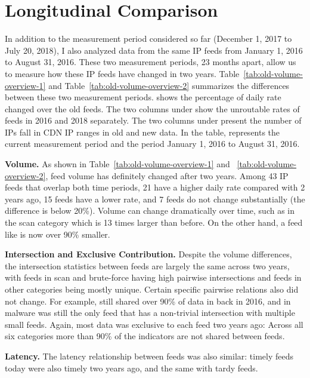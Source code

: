 \section{Longitudinal Comparison}
\label{sec:new_vs_old}

In addition to the measurement period considered so far (December 1, 2017 to July 20, 2018), I also analyzed data from the same IP feeds from January 1, 2016 to August 31, 2016. These two measurement periods, 23 months apart, allow us to measure how these IP feeds have changed in two years. Table~\ref{tab:old-volume-overview-1} and
Table~\ref{tab:old-volume-overview-2} summarizes the differences between these two measurement periods.  shows the percentage of daily rate changed over the old feeds.
The two columns under  show the unroutable rates of feeds in 2016 and 2018 separately. The two columns under  present the number of IPs fall in CDN IP ranges in old and new data. In the table,  represents the current measurement period and  the period  January 1, 2016 to August 31, 2016.


\textbf{Volume.}
As shown in Table~\ref{tab:old-volume-overview-1} and ~\ref{tab:old-volume-overview-2}, feed volume has definitely changed after two years. Among 43 IP feeds that overlap both time periods,
21 have a higher daily rate compared with 2 years ago, 15 feeds
have a lower rate, and 7 feeds do not change substantially (the difference is below 20\%).
Volume can change dramatically over time, such as {\feedTSAlienVault}
in the scan category which is 13 times larger than before. On the other hand, a feed like {\feedTSBots} is now over 90\% smaller.

\textbf{Intersection and Exclusive Contribution.}
Despite the volume differences, the intersection statistics between feeds are largely the same across two years,
with feeds in scan and brute-force having high pairwise intersections and
feeds in other categories being mostly unique. Certain specific pairwise relations also did not change.
For example, {\feedbadipssh} still shared over 90\% of data in {\feeddangerrule} back in 2016, and {\feedetiprep} in malware
was still the only feed that has a non-trivial intersection with multiple small feeds.
Again, most data was exclusive to each feed two years ago: Across all
six categories more than 90\% of the indicators are not shared between feeds.

\textbf{Latency.}
The latency relationship between feeds was also similar:
timely feeds today were also timely two years ago, and the same with tardy feeds.

